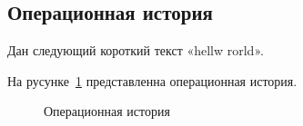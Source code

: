 \clearpage

\subsection{Операционная история}

Дан следующий короткий текст «hellw rorld».

На русунке~\ref{fig:oper_history} представленна операционная история.

\begin{figure}[h!]
	\caption{Операционная история}
	\label{fig:oper_history}
\end{figure}

